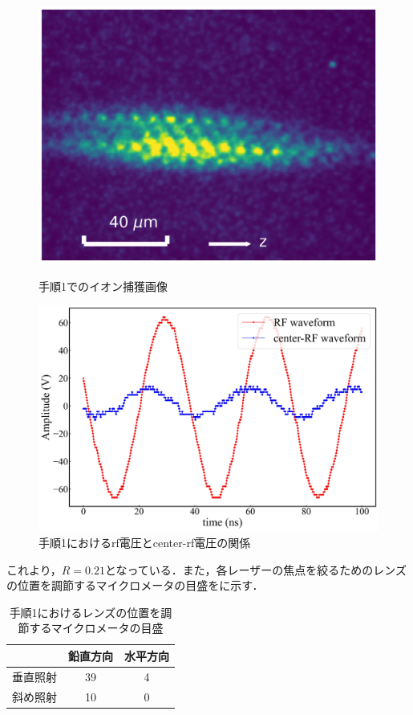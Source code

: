 \begin{enumerate}
\begin{figure}[h]
	\begin{minipage}{0.48\linewidth}
	\begin{center}
		\includegraphics[width = 0.6\columnwidth]{./methods/figure/1_2D.jpg}
		\caption{手順1でのイオン捕獲画像}
		\label{fig:1_2D}
	\end{center}
	\end{minipage}
	\begin{minipage}{0.48\linewidth}
		\begin{center}
			\includegraphics[width = 0.9\columnwidth]{./methods/figure/1_2D_wave.jpg}
			\caption{手順1におけるrf電圧とcenter-rf電圧の関係}
			\label{fig:1_2D_wave}
		\end{center}
	\end{minipage}
\end{figure}

これより，$R=0.21$となっている．また，各レーザーの焦点を絞るためのレンズの位置を調節するマイクロメータの目盛をに示す．

\begin{table}[h]
	\begin{center}
	\caption{手順1におけるレンズの位置を調節するマイクロメータの目盛}
	\label{tab:1_2D}
	\begin{tabular}{c|cc} \hline \hline
		&鉛直方向&水平方向 \\ \hline
		垂直照射&39 & 4 \\ 
		斜め照射&10 & 0 \\ \hline
	\end{tabular}
	\end{center}
\end{table}


\end{enumerate}
